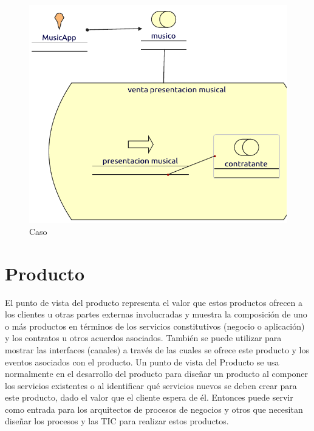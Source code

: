 \begin{figure}[h!]
	\centering
	\includegraphics[width=0.8\linewidth]{Arquitectura/Negocio/imgs/cooperacionProceso.pdf}
	\caption{Caso}
\end{figure}
\newpage

\section{Producto}
El punto de vista del producto representa el valor que estos productos ofrecen a los clientes u otras partes externas involucradas y muestra la composición de uno o más productos en términos de los servicios constitutivos (negocio o aplicación) y los contratos u otros acuerdos asociados. También se puede utilizar para mostrar las interfaces (canales) a través de las cuales se ofrece este producto y los eventos asociados con el producto. Un punto de vista del Producto se usa normalmente en el desarrollo del producto para diseñar un producto al componer los servicios existentes o al identificar qué servicios nuevos se deben crear para este producto, dado el valor que el cliente espera de él. Entonces puede servir como entrada para los arquitectos de procesos de negocios y otros que necesitan diseñar los procesos y las TIC para realizar estos productos.
